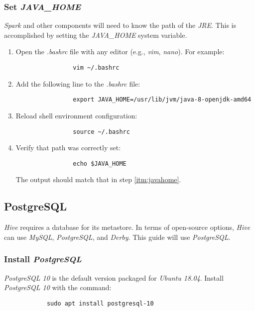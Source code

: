 \documentclass{article}
\begin{document}
        \subsubsection{Set \emph{JAVA\_HOME}}
        \label{subsec:javahome}
        \emph{Spark} and other components will need to know the path of the
        \emph{JRE}. This is accomplished by setting the \emph{JAVA\_HOME}
        system variable.

        \begin{enumerate}
            \item Open the \emph{.bashrc} file with any editor (e.g., \emph{vim}, \emph{nano}).
            For example:
            \begin{verbatim}
                vim ~/.bashrc
            \end{verbatim}
            
            \item Add the following line to the \emph{.bashrc} file:
            \label{itm:javahome}
            \begin{verbatim}
                export JAVA_HOME=/usr/lib/jvm/java-8-openjdk-amd64                 
            \end{verbatim}
            
            \item Reload shell environment configuration:
            \begin{verbatim}
                source ~/.bashrc
            \end{verbatim}
            
            \item Verify that path was correctly set:
            \begin{verbatim}
                echo $JAVA_HOME
            \end{verbatim}
            The output should match that in step \ref{itm:javahome}.
        \end{enumerate}

    \subsection{PostgreSQL}
    \label{subsec:postgres}
    \emph{Hive} requires a database for its metastore. In terms of open-source options, \emph{Hive} can use
    \emph{MySQL}, \emph{PostgreSQL}, and \emph{Derby}. This guide will use \emph{PostgreSQL}.

        \subsubsection{Install \emph{PostgreSQL}}
        \emph{PostgreSQL 10} is the default version packaged for \emph{Ubuntu 18.04}. Install
        \emph{PostgreSQL 10} with the command:
        \begin{verbatim}
            sudo apt install postgresql-10
        \end{verbatim}
\end{document}

